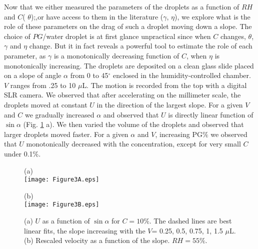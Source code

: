 \documentclass[aps,prl,reprint,superscriptaddress,amsmath,amssymb,]{revtex4-1}
\begin{document}
Now that we either measured the parameters of the droplets as a function of $RH$ and $C$( $\theta$);,or have access to them in the literature ($\gamma$, $\eta$), we explore what is the role of these parameters on the drag of such a droplet moving down a slope. The choice of $PG$/water droplet is at first glance unpractical since when $C$ changes, $\theta$, $\gamma$ and $\eta$ change. But it in fact reveals a powerful tool to estimate the role of each parameter, as $\gamma$ is a monotonically decreasing function of $C$, when $\eta$ is monotonically increasing. The droplets are deposited on a clean glass slide placed on a slope of angle $\alpha$ from 0 to 45$^\circ$ enclosed in the humidity-controlled chamber. $V$ ranges from .25 to 10 $\mu$L. The motion is recorded from the top with a digital SLR camera. We observed that after accelerating on the millimeter scale, the droplets moved at constant $U$ in the direction of the largest slope.
For a given $V$ and $C$ we gradually increased $\alpha$ and observed that $U$ is directly linear function of $\sin \alpha$ (Fig. \ref{figure3} a). We then varied the volume of the droplets and observed that larger droplets moved faster. For a given $\alpha$ and $V$, increasing PG$\%$ we observed that $U$ monotonically decreased with the concentration, except for very small $C$ under 0.1\%.

\begin{figure}
\begin{minipage}[t]{0.49\columnwidth}
\centering
 \hspace{0.2cm} (a) \\ \vspace{0.cm}
\texttt{[image: Figure3A.eps]}
\end{minipage}
\begin{minipage}[t]{0.49\columnwidth}
\centering
 \hspace{0.2cm} (b) \\ \vspace{0.cm}
\texttt{[image: Figure3B.eps]}
\end{minipage}
\caption{(a) $U$ as a function of $\sin \alpha$ for $C=10\%$. The dashed lines are best linear fits, the slope increasing with the $V$= 0.25, 0.5, 0.75, 1, 1.5 $\mu$L. (b) Rescaled velocity as a function of the slope. $RH=55\%$.}
\label{figure3}
\end{figure}
\end{document}
